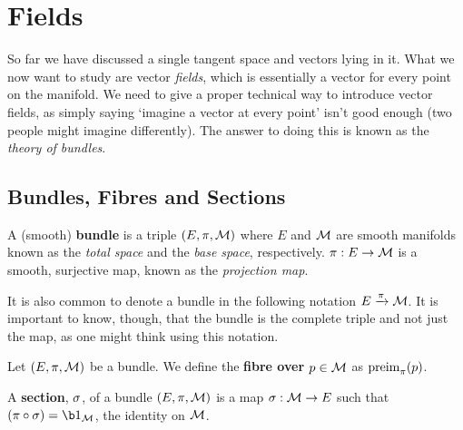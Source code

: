 \chapter{Fields}

So far we have discussed a single tangent space and vectors lying in it. What we now want to study are vector \textit{fields}, which is essentially a vector for every point on the manifold. We need to give a proper technical way to introduce vector fields, as simply saying `imagine a vector at every point' isn't good enough (two people might imagine differently). The answer to doing this is known as the \textit{theory of bundles}.

\section{Bundles, Fibres and Sections}

\bd[Bundle]
    A (smooth) \textbf{bundle} is a triple $(E,\pi,\mathcal{M})$ where $E$ and $\mathcal{M}$ are smooth manifolds known as the \textit{total space} and the \textit{base space}, respectively. $\pi:E\to\mathcal{M}$ is a smooth, surjective map, known as the \textit{projection map}.
\ed 

\bnn 
    It is also common to denote a bundle in the following notation $E\xrightarrow{\pi}\mathcal{M}$. It is important to know, though, that the bundle is the complete triple and not just the map, as one might think using this notation. 
\enn 

    Let $(E,\pi,\mathcal{M})$ be a bundle. We define the \textbf{fibre over $p\in\mathcal{M}$} as $\text{preim}_{\pi}(p)$.
\ed 

\bd[Section]
    A \textbf{section}, $\sigma$, of a bundle $(E,\pi,\mathcal{M})$ is a map $\sigma:\mathcal{M}\to E$ such that $(\pi\circ\sig)=\b1_{\cM}$, the identity on $\mathcal{M}$.
\ed 

